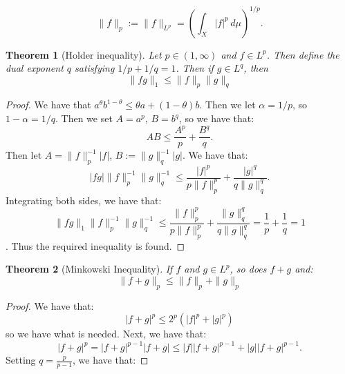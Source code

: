 \documentclass{article}
\newtheorem{theorem}{Theorem}
\theoremstyle{definition}
\numberwithin{theorem}{section}
\numberwithin{equation}{section}
\begin{document}
\begin{equation}
	\|f \|_p := \|f\|_{L^p} = \left(\int_X |f|^p \,  d\mu \right)^{1/p}.
\end{equation}


\begin{theorem}[Holder inequality]
	Let $p \in (1, \infty)$ and $f \in L^p$. Then define the dual exponent $q$ satisfying $1/p + 1/q = 1$. Then if $g \in L^q$, then 
	\begin{equation}
		\| fg \|_1 \leq \|f \|_p \| g \|_q
	\end{equation}
\end{theorem}
\begin{proof}
	We have that $a^\theta b^{1-\theta} \leq \theta a + (1 - \theta) b$.
	Then we let $\alpha = 1/p$, so $1 - \alpha = 1/q$. Then we set $A = a^p$, $B = b^q$, so we have that:
	\begin{equation}
		AB \leq \frac{A^p}{p} + \frac{B^q}{q}.
	\end{equation}
	Then let $A = \|f \|_p^{-1} |f|$, $B := \|g \|_q^{-1} |g|$. We have that:
	\begin{equation}
		|fg| \|f \|_p^{-1} \|g \|_q^{-1} \leq \frac{|f|^p}{p \|f\|_p^p} + \frac{|g|^q}{q \| g \|_q^q}.
	\end{equation}
	Integrating both sides, we have that:
	\begin{equation}
		\|fg \|_1 \|f \|_p^{-1} \|g \|_q^{-1} \leq \frac{\|f \|_p^p}{p \|f \|_p^p} + \frac{\|g \|_q^q}{q \|g \|_q^q} = \frac{1}{p} + \frac{1}{q} = 1 
	\end{equation}.
	Thus the required inequality is found. 
\end{proof}

\begin{theorem}[Minkowski Inequality]
	If $f$ and $g \in L^p$, so does $f + g$ and:
	\begin{equation}
	\| f + g \|_p \leq \|f \|_p + \| g \|_p
\end{equation}
\end{theorem}
\begin{proof}
	We have that:
	\begin{equation}
		|f + g|^p \leq 2^p (|f|^p + |g|^p)
	\end{equation}
	so we have what is needed. 
	Next, we have that:
	\begin{equation}
		|f + g|^p = |f + g|^{p-1} |f + g| \leq |f| |f + g|^{p-1} + |g| |f + g|^{p-1}.
	\end{equation}
	Setting $q = \frac{p}{p-1}$, we have that:
\end{proof}
\end{document}
